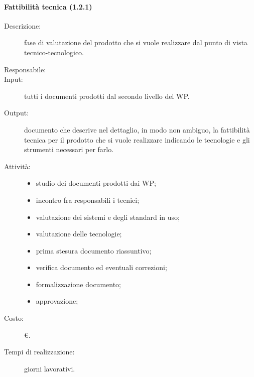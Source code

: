 \paragraph{Fattibilità tecnica (1.2.1)}
\begin{description}
\item[Descrizione:] fase di valutazione del prodotto che si vuole realizzare dal punto di vista tecnico-tecnologico.
\item[Responsabile:] 
\item[Input:] tutti i documenti prodotti dal secondo livello del WP.
\item[Output:] documento che descrive nel dettaglio, in modo non ambiguo, la fattibilità tecnica per il prodotto che si vuole realizzare indicando le tecnologie e gli strumenti necessari per farlo.
\item[Attività:]
\begin{itemize}
\item studio dei documenti prodotti dai WP;
\item incontro fra responsabili i tecnici;
\item valutazione dei sistemi e degli standard in uso;
\item valutazione delle tecnologie;
\item prima stesura documento riassuntivo;
\item verifica documento ed eventuali correzioni;
\item formalizzazione documento;
\item approvazione;
\end{itemize}
\item[Costo:] \euro{}.
\item[Tempi di realizzazione:]  giorni lavorativi.
\end{description}

